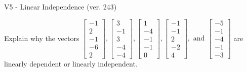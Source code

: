 \begin{exercise}
  \begin{exerciseTitle}V5 - Linear Independence (ver. 243)\end{exerciseTitle}
  \begin{exerciseStatement}
    Explain why the vectors \(\left[\begin{array}{r}
-1 \\
2 \\
-1 \\
-6 \\
2
\end{array}\right] , \left[\begin{array}{r}
3 \\
-1 \\
3 \\
-4 \\
-4
\end{array}\right] , \left[\begin{array}{r}
1 \\
-4 \\
-1 \\
-1 \\
0
\end{array}\right] , \left[\begin{array}{r}
-1 \\
-1 \\
2 \\
-2 \\
4
\end{array}\right] , \text{ and } \left[\begin{array}{r}
-5 \\
-1 \\
-4 \\
-1 \\
-3
\end{array}\right]\) are linearly dependent or linearly independent.	



\end{exerciseStatement}
\end{exercise}
